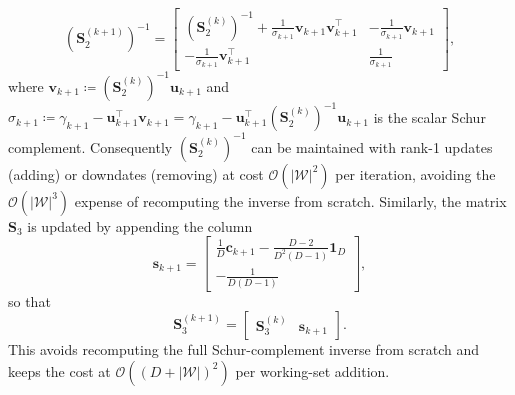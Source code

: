 \documentclass[a4paper,12pt,openany]{book}
\renewcommand{\c}{\mathbf{c}}
\newcommand{\s}{\mathbf{s}}
\renewcommand{\u}{\mathbf{u}}
\renewcommand{\v}{\mathbf{v}}
\begin{document}
\begin{appendices}
\begin{equation}
(\mathbf{S}_2^{(k+1)})^{-1} = \begin{bmatrix} (\mathbf{S}_2^{(k)})^{-1} + \frac{1}{\sigma_{k+1}}\v_{k+1}\v_{k+1}^\top & -\frac{1}{\sigma_{k+1}}\v_{k+1} \\[2pt] -\frac{1}{\sigma_{k+1}}\v_{k+1}^\top & \frac{1}{\sigma_{k+1}} \end{bmatrix},
\end{equation}
where $\v_{k+1}\coloneqq(\mathbf{S}_2^{(k)})^{-1}\u_{k+1}$ and $\sigma_{k+1}\coloneqq\gamma_{k+1}-\u_{k+1}^\top\v_{k+1}=\gamma_{k+1}-\u_{k+1}^\top(\mathbf{S}_2^{(k)})^{-1}\u_{k+1}$ is the scalar Schur complement. Consequently $(\mathbf{S}_2^{(k)})^{-1}$ can be maintained with rank-1 updates (adding) or downdates (removing) at cost $\mathcal{O}(|\mathcal{W}|^2)$ per iteration, avoiding the $\mathcal{O}(|\mathcal{W}|^3)$ expense of recomputing the inverse from scratch. Similarly, the matrix $\mathbf{S}_3$ is updated by appending the column
\begin{equation}
	\label{eq:s_e}
	\s_{k+1}
	=
	\begin{bmatrix}
		\displaystyle\frac{1}{D}\c_{k+1}-\frac{D-2}{D^2(D-1)}\mathbf{1}_D\\[10pt]
		\displaystyle-\frac{1}{D(D-1)}
	\end{bmatrix},
\end{equation}
so that
\begin{equation}
	\label{eq:S3_update}
	\mathbf{S}_3^{(k+1)}
	=
	\begin{bmatrix}
		\mathbf{S}_3^{(k)} & \s_{k+1}
	\end{bmatrix}.
\end{equation}
This avoids recomputing the full Schur-complement inverse from scratch and keeps the cost at $\mathcal{O}((D+|\mathcal{W}|)^2)$ per working-set addition.


\end{appendices}
\end{document}
